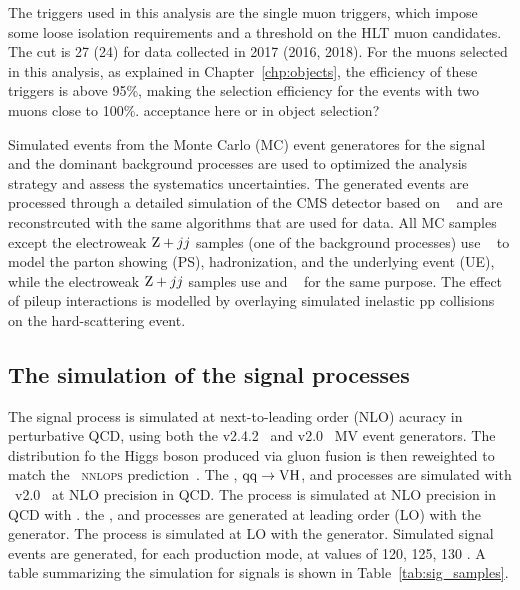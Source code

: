 The triggers used in this analysis are the single muon triggers, which impose some loose isolation requirements and a \pt threshold on the HLT muon candidates.
The \pt cut is 27 (24) \GeV for data collected in 2017 (2016, 2018). 
For the muons selected in this analysis, as explained in Chapter~\ref{chp:objects}, the efficiency of these triggers is above 95\%, 
making the selection efficiency for the events with two muons close to 100\%.
acceptance here or in object selection?

Simulated events from the Monte Carlo (MC) event generatores for the signal and the dominant background processes are used to 
optimized the analysis strategy and assess the systematics uncertainties.
The generated events are processed through a detailed simulation of the CMS detector based on \GEANTfour~\cite{AGOSTINELLI2003250}
and are reconstrcuted with the same algorithms that are used for data.
All MC samples except the electroweak $\mathrm{Z}+jj$ samples (one of the background processes) use ~\cite{SJOSTRAND2015159} to model the parton showing (PS), 
hadronization, and the underlying event (UE), while the electroweak $\mathrm{Z}+jj$ samples use \HERWIGpp and \HERWIGSeven~\cite{Bellm:2015jjp} for the same purpose.
The effect of pileup interactions is modelled by overlaying simulated inelastic pp collisions on the hard-scattering event.\\

\bigskip
\subsection{The simulation of the signal processes}
The \ggH signal process is simulated at next-to-leading order (NLO) acuracy in perturbative QCD, using both the \MGvATNLO v2.4.2~\cite{Alwall:2014hca}
and \POWHEG v2.0~\cite{Nason_2004, Frixione_2007, Alioli:2010xd, Bagnaschi:2011tu} MV event generators. 
The \pt distribution fo the Higgs boson produced via gluon fusion is then reweighted to match the \POWHEG~\textsc{nnlops} prediction~\cite{Hamilton:2013fea,Hamilton:2015nsa}. 
The \qqH, ${\mathrm{q}\mathrm{q}\to\mathrm{V}\mathrm{H}}$, and \ttH processes are simulated with \POWHEG~v2.0~\cite{Nason:2009ai,Luisoni:2013kna,Hartanto:2015uka} at NLO precision in QCD. 
The \bbH process is simulated at NLO precision in QCD with \POWHEG.
the \tHq, and \tHW processes are generated at leading order (LO) with the \MGvATNLO generator.
The \ggZH process is simulated at LO with the \POWHEG generator.
Simulated signal events are generated, for each production mode, at \mh values of 120, 125, 130 \GeV.
A table summarizing the simulation for signals is shown in Table~\ref{tab:sig_samples}.

